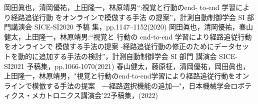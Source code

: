 \documentclass{jarticle}
\begin{document}
\footnotesize
\begin{thebibliography}{99}

岡田眞也，清岡優祐，上田隆一，林原靖男“:視覚と行動のend- to-end 学習により経路追従行動 をオンラインで模倣する手法 の提案”，計測自動制御学会 SI 部門講演会 SICE-SI2020 予稿 集，pp.1147–1152(2020)
岡田眞也，清岡優祐，春山健太，上田隆一，林原靖男:“視覚と 行動の end-to-end 学習により経路追従行動 をオンラインで 模倣する手法の提案 -経路追従行動の修正のためにデータセッ トを動的に追加する手法の検討”，計測自動制御学会 SI 部門 講演会 SICE-SI2021 予稿集，pp.1066-1070(2021)
春山健太，藤原柾，清岡優祐，岡田眞也，上田隆一，林原靖男，"視覚と行動のend-to-end学習により経路追従行動をオンラインで模倣する手法の提案　―経路選択機能の追加―"，日本機械学会ロボティクス・メカトロニクス講演会'22予稿集，(2022)


\end{thebibliography}

\normalsize
\end{document}
